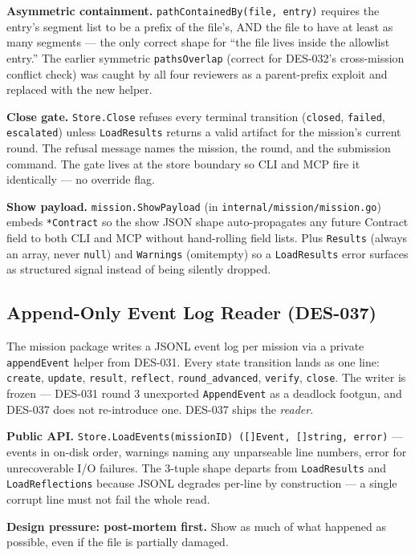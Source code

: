 \documentclass[a4paper,10pt]{article}
\newcommand{\field}[1]{\texttt{#1}}
\newcommand{\fpath}[1]{\texttt{#1}}
\begin{document}
\textbf{Asymmetric containment.}  \texttt{pathContainedBy(file,
entry)} requires the entry's segment list to be a prefix of the
file's, AND the file to have at least as many segments --- the only
correct shape for ``the file lives inside the allowlist entry.''
The earlier symmetric \texttt{pathsOverlap} (correct for DES-032's
cross-mission conflict check) was caught by all four reviewers as a
parent-prefix exploit and replaced with the new helper.

\textbf{Close gate.}  \texttt{Store.Close} refuses every terminal
transition (\texttt{closed}, \texttt{failed}, \texttt{escalated})
unless \texttt{LoadResults} returns a valid artifact for the
mission's current round.  The refusal message names the mission,
the round, and the submission command.  The gate lives at the store
boundary so CLI and MCP fire it identically --- no override flag.

\textbf{Show payload.}  \texttt{mission.ShowPayload} (in
\fpath{internal/mission/mission.go}) embeds \texttt{*Contract} so
the show JSON shape auto-propagates any future Contract field to
both CLI and MCP without hand-rolling field lists.  Plus
\field{Results} (always an array, never \texttt{null}) and
\field{Warnings} (omitempty) so a \texttt{LoadResults} error
surfaces as structured signal instead of being silently dropped.

\subsection{Append-Only Event Log Reader (DES-037)}

The mission package writes a JSONL event log per mission via a
private \texttt{appendEvent} helper from DES-031.  Every state
transition lands as one line: \texttt{create}, \texttt{update},
\texttt{result}, \texttt{reflect}, \texttt{round\_advanced},
\texttt{verify}, \texttt{close}.  The writer is frozen ---
DES-031 round 3 unexported \texttt{AppendEvent} as a deadlock
footgun, and DES-037 does not re-introduce one.  DES-037 ships the
\emph{reader}.

\textbf{Public API.}
\texttt{Store.LoadEvents(missionID) ([]Event, []string, error)} ---
events in on-disk order, warnings naming any unparseable line
numbers, error for unrecoverable I/O failures.  The 3-tuple shape
departs from \texttt{LoadResults} and \texttt{LoadReflections}
because JSONL degrades per-line by construction --- a single
corrupt line must not fail the whole read.

\textbf{Design pressure: post-mortem first.}  Show as much of what
happened as possible, even if the file is partially damaged.
\end{document}
